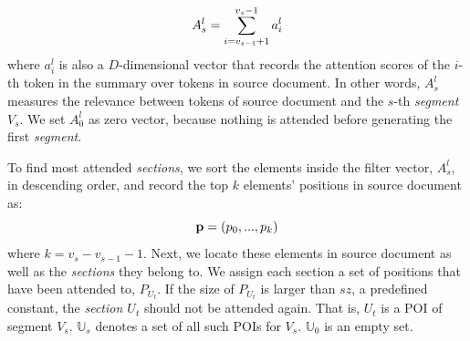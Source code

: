 \begin{equation}
\small
    A_{s}^{l} = \sum_{i=v_{s-1}+1}^{v_{s}-1}a_{i}^{l}
\end{equation}
where $a_i^l$ is also a $D$-dimensional vector that records 
the attention scores of the $i$-th token in the summary over 
tokens in source document. In other words, $ A_{s}^{l}$ 
measures the relevance between tokens of source document and 
the $s$-th \textit{segment} $V_s$.
We set $A_{0}^{l}$ as zero vector, because nothing is attended before generating the first \textit{segment}. 


To find most attended \textit{sections}, 
we sort the elements inside the filter vector, 
$A_{s}^{l}$, in descending order, 
and record the top $k$ elements' positions in 
source document as: 
\begin{equation}
\small
    \mathbf{p}=(p_{0},...,p_{k})
\end{equation}
where $k=v_{s}-v_{s-1}-1$.
Next, we locate these elements in source document as well as
the \textit{sections} they belong to. 
We assign each section a set of positions that have been attended to, 
$P_{U_{t}}$. 
If the size of $P_{U_{t}}$ is larger than
$sz$, a predefined constant,
the \textit{section $U_{t}$} should not be attended again. 
That is, $U_{t}$ is a POI of segment $V_{s}$.
$\mathbb{U}_{s}$ denotes a set of all such POIs for $V_s$.
$\mathbb{U}_{0}$ is an empty set.

